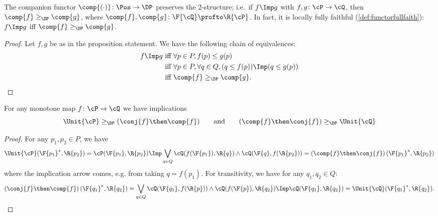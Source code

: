 \begin{proposition}
    \label{prop:companion_2}
    The companion functor $\comp{(\cdot)}\colon\Pos\to\DP$ preserves the 2-structure; i.e.\ if $f\Imp g$ with $f,g\colon \cP \to\cQ $, then $\comp{f}\geq_\DP\comp{g}$, where $\comp{f},\comp{g}\colon \F{\cQ} \profto\R{\cP}$. In fact, it is locally fully faithful (\cref{def:functorfullfaith}): $f\Imp g$ iff $\comp{f}\geq_\DP \comp{g}$.
\end{proposition}
\begin{proof}
    Let $f,g$ be as in the proposition statement. We have the following chain of equivalences:
    \begin{equation}
        \begin{aligned}
            f\Imp g&\text{ iff }
            \forall p\in P, f(p)\leq g(p)\\&\text{ iff }
            \forall p\in P, \forall q\in Q, (q\leq f(p))\Imp (q\leq g(p))\\&\text{ iff }
            \comp{f}\geq_\DP \comp{g}.
        \end{aligned}
    \end{equation}
\end{proof}

\begin{proposition}
    \label{prop:comp_conj_adj}
    For any monotone map $f\colon\cP \to\cQ $ we have implications
    \begin{equation}
        \Unit{\cP }\geq_\DP (\conj{f}\then \comp{f})
        \qquad\text{and}\qquad
        (\comp{f}\then \conj{f})\geq_\DP \Unit{\cQ }
    \end{equation}
\end{proposition}
\begin{proof}
    For any $p_1,p_2\in P$, we have
    \begin{equation}
        \Unit{\cP }(\F{p_1}^*,\R{p_2})=\cP (\F{p_1},\R{p_2})
        \Imp\bigvee_{q\in Q}\cQ (f(\F{p_1}),\R{q})\wedge\cQ (\F{q},f(\R{p_2}))=\left(\comp{f}\then \conj{f}\right)(\F{p_1}^*,\R{p_2})
    \end{equation}
    where the implication arrow comes, e.g. from taking $q=f(p_1)$. For transitivity, we have for any $q_1,q_2\in Q$:
    \begin{equation}
        \left(\conj{f}\then \comp{f}\right)(\F{q_1}^*,\R{q_2})=\bigvee_{q\in Q}\cQ (\F{q_1},f(\R{p}))\wedge\cQ (f(\F{p}),\R{q_2})
        \Imp\cQ (\F{q_1},\R{q_2})=\Unit{\cQ }(\F{q_1}^*,\R{q_2}).
    \end{equation}
\end{proof}

